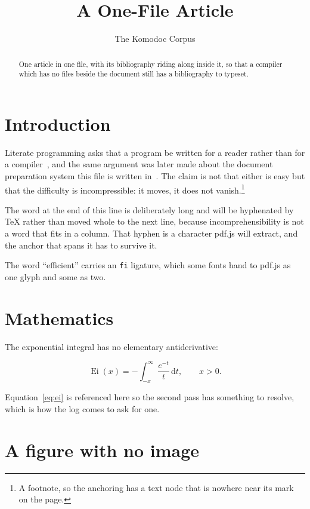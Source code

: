 \documentclass[11pt]{article}
\title{A One-File Article}
\author{The Komodoc Corpus}
\date{}
\begin{document}
\maketitle

\begin{abstract}
  One article in one file, with its bibliography riding along inside it, so
  that a compiler which has no files beside the document still has a
  bibliography to typeset.
\end{abstract}

\section{Introduction}

Literate programming asks that a program be written for a reader rather than
for a compiler~\cite{knuth1984}, and the same argument was later made about
the document preparation system this file is written in~\cite{lamport1994}.
The claim is not that either is easy but that the difficulty is
incompressible: it moves, it does not vanish.\footnote{A footnote, so the
anchoring has a text node that is nowhere near its mark on the page.}

The word at the end of this line is deliberately long and will be
hyphenated by \TeX{} rather than moved whole to the next line, because
incomprehensibility is not a word that fits in a column. That hyphen is a
character pdf.js will extract, and the anchor that spans it has to survive it.

The word ``efficient'' carries an \texttt{fi} ligature, which some fonts hand
to pdf.js as one glyph and some as two.

\section{Mathematics}

The exponential integral has no elementary antiderivative:

\begin{equation}
  \label{eq:ei}
  \operatorname{Ei}(x) = -\int_{-x}^{\infty} \frac{e^{-t}}{t}\,\mathrm{d}t,
  \qquad x > 0 .
\end{equation}

Equation~\eqref{eq:ei} is referenced here so the second pass has something to
resolve, which is how the log comes to ask for one.

\section{A figure with no image}
\end{document}
